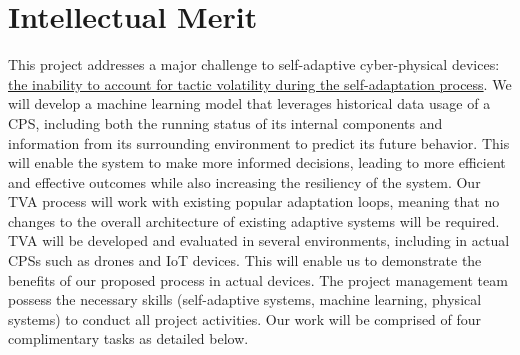 \documentclass[11pt]{proposalnsf}
\newcommand{\dan}[1]{\textcolor{blue}{{\it [Dan says: #1]}}}
\newlength\q %
\begin{document}
\begin{sloppypar}
\section{Intellectual Merit}
This project addresses a major challenge to self-adaptive cyber-physical devices: \ul{the inability to account for tactic volatility during the self-adaptation process}. We will develop a machine learning model that leverages historical data usage of a CPS, including both the running status of its internal components and information from its surrounding environment to predict its future behavior. This will enable the system to make more informed decisions, leading to more efficient and effective outcomes while also increasing the resiliency of the system. Our TVA process will work with existing popular adaptation loops, meaning that no changes to the overall architecture of existing adaptive systems will be required. TVA will be developed and evaluated in several environments, including in actual CPSs such as drones and IoT devices. This will enable us to demonstrate the benefits of our proposed process in actual devices. The project management team possess the necessary skills (self-adaptive systems, machine learning, physical systems) to conduct all project activities. Our work will be comprised of four complimentary tasks as detailed below. 








	

\end{sloppypar}
\end{document}
